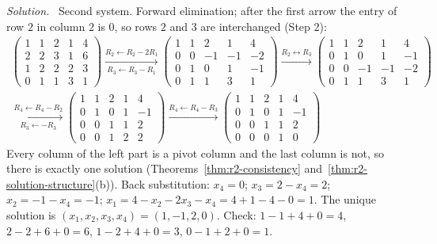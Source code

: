 \documentclass[12pt]{article}
\theoremstyle{definition}
\newenvironment{solution}{\par\noindent\textit{Solution.}\ }{\par\smallskip}
\begin{document}
\begin{solution}
Second system. Forward elimination; after the first arrow the entry of row \(2\) in column \(2\)
is \(0\), so rows \(2\) and \(3\) are interchanged (Step 2):
\[
\begin{gathered}
\left(\begin{array}{cccc|c}1&1&2&1&4\\2&2&3&1&6\\1&2&2&2&3\\0&1&1&3&1\end{array}\right)
\xrightarrow[R_3\leftarrow R_3-R_1]{R_2\leftarrow R_2-2R_1}
\left(\begin{array}{cccc|c}1&1&2&1&4\\0&0&-1&-1&-2\\0&1&0&1&-1\\0&1&1&3&1\end{array}\right)
\xrightarrow{R_2\leftrightarrow R_3}
\left(\begin{array}{cccc|c}1&1&2&1&4\\0&1&0&1&-1\\0&0&-1&-1&-2\\0&1&1&3&1\end{array}\right)
\\
\xrightarrow[R_3\leftarrow -R_3]{R_4\leftarrow R_4-R_2}
\left(\begin{array}{cccc|c}1&1&2&1&4\\0&1&0&1&-1\\0&0&1&1&2\\0&0&1&2&2\end{array}\right)
\xrightarrow{R_4\leftarrow R_4-R_3}
\left(\begin{array}{cccc|c}1&1&2&1&4\\0&1&0&1&-1\\0&0&1&1&2\\0&0&0&1&0\end{array}\right)
\end{gathered}
\]
Every column of the left part is a pivot column and the last column is not, so there is exactly
one solution (Theorems~\ref{thm:r2-consistency} and~\ref{thm:r2-solution-structure}(b)). Back
substitution: \(x_4=0\); \(x_3=2-x_4=2\); \(x_2=-1-x_4=-1\);
\(x_1=4-x_2-2x_3-x_4=4+1-4-0=1\). The unique solution is \((x_1,x_2,x_3,x_4)=(1,-1,2,0)\).
Check: \(1-1+4+0=4\), \(2-2+6+0=6\), \(1-2+4+0=3\), \(0-1+2+0=1\).
\end{solution}
\end{document}
